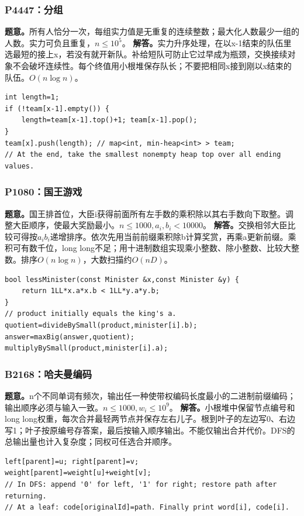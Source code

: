 \subsubsection{P4447：分组}
\textbf{题意。}所有人恰分一次，每组实力值是无重复的连续整数；最大化人数最少一组的人数。实力可负且重复，$n\le10^5$。
\textbf{解答。}实力升序处理，在以x-1结束的队伍里选最短的接上x，若没有就开新队。补给短队可防止它过早成为瓶颈，交换接续对象不会破坏连续性。每个终值用小根堆保存队长；不要把相同x接到刚以x结束的队伍。$O(n\log n)$。
\begin{lstlisting}
int length=1;
if (!team[x-1].empty()) {
    length=team[x-1].top()+1; team[x-1].pop();
}
team[x].push(length); // map<int, min-heap<int> > team;
// At the end, take the smallest nonempty heap top over all ending values.
\end{lstlisting}

\subsubsection{P1080：国王游戏}
\textbf{题意。}国王排首位，大臣i获得前面所有左手数的乘积除以其右手数向下取整。调整大臣顺序，使最大奖励最小。$n\le1000,a_i,b_i<10000$。
\textbf{解答。}交换相邻大臣比较可得按$a_ib_i$递增排序。依次先用当前前缀乘积除b计算奖赏，再乘a更新前缀。乘积可有数千位，long long不足；用十进制数组实现乘小整数、除小整数、比较大整数。排序$O(n\log n)$，大数扫描约$O(nD)$。
\begin{lstlisting}
bool lessMinister(const Minister &x,const Minister &y) {
    return 1LL*x.a*x.b < 1LL*y.a*y.b;
}
// product initially equals the king's a.
quotient=divideBySmall(product,minister[i].b);
answer=maxBig(answer,quotient);
multiplyBySmall(product,minister[i].a);
\end{lstlisting}

\subsubsection{B2168：哈夫曼编码}
\textbf{题意。}n个不同单词有频次，输出任一种使带权编码长度最小的二进制前缀编码；输出顺序必须与输入一致。$n\le1000,w_i\le10^9$。
\textbf{解答。}小根堆中保留节点编号和long long权重，每次合并最轻两节点并保存左右儿子。根到叶子的左边写0、右边写1；叶子按原编号存答案，最后按输入顺序输出。不能仅输出合并代价。DFS的总输出量也计入复杂度；同权可任选合并顺序。
\begin{lstlisting}
left[parent]=u; right[parent]=v;
weight[parent]=weight[u]+weight[v];
// In DFS: append '0' for left, '1' for right; restore path after returning.
// At a leaf: code[originalId]=path. Finally print word[i], code[i].
\end{lstlisting}

